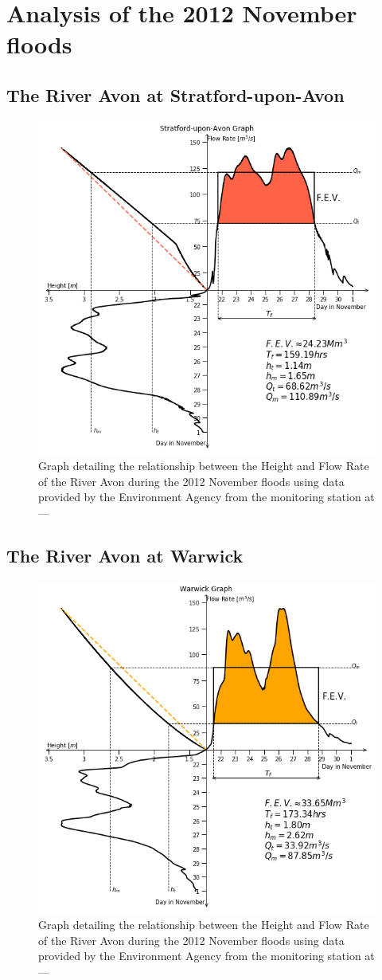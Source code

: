 \documentclass[11 pt, a4paper]{article}
\begin{document}
\newpage
\section{Analysis of the 2012 November floods}
\subsection{The River Avon at Stratford-upon-Avon}
\begin{figure}[H]
\begin{center}
\includegraphics[width=.5\linewidth]{Stratford-Quadrant_Graph.png}
\caption{Graph detailing the relationship between the Height and Flow Rate of the River Avon during the 2012 November floods using data provided by the Environment Agency from the  monitoring station at ---}
\end{center}
\end{figure}
\subsection{The River Avon at Warwick}
\begin{figure}[H]
\begin{center}
\includegraphics[width=.5\linewidth]{Warwick-Quadrant_Graph.png}
\caption{Graph detailing the relationship between the Height and Flow Rate of the River Avon during the 2012 November floods using data provided by the Environment Agency from the  monitoring station at ---}
\end{center}
\end{figure}
\end{document}
